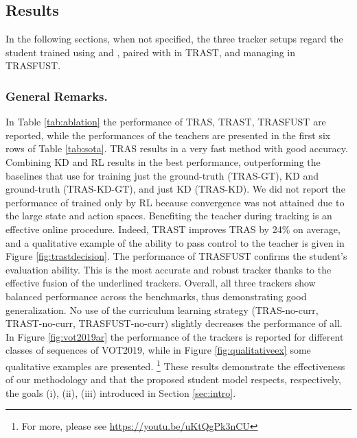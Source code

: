 \documentclass[runningheads]{llncs}
\makeatletter
\def\myalgonamefirst{TRAS\@\xspace}
\def\myalgonamesecond{TRAST\@\xspace}
\def\myalgonamethird{TRASFUST\@\xspace}
\makeatother
\begin{document}
\subsection{Results}
In the following sections, when not specified, the three tracker setups regard the student trained using  and , paired with  in \myalgonamesecond, and managing  in \myalgonamethird.

\subsubsection{General Remarks.}
In Table \ref{tab:ablation} the performance of \myalgonamefirst, \myalgonamesecond, \myalgonamethird are reported, while the performances of the teachers are presented in the first six rows of Table \ref{tab:sota}. \myalgonamefirst results in a very fast method with good accuracy. Combining KD and RL results in the best performance, outperforming the baselines that use for training just the ground-truth (\myalgonamefirst-GT), KD and ground-truth (\myalgonamefirst-KD-GT), and just KD (\myalgonamefirst-KD). We did not report the performance of  trained only by RL because convergence was not attained due to the large state and action spaces. 
Benefiting the teacher during tracking is an effective online procedure. Indeed, \myalgonamesecond improves \myalgonamefirst by 24\% on average, and a qualitative example of the ability to pass control to the teacher is given in Figure \ref{fig:trastdecision}.
The performance of \myalgonamethird confirms the student's evaluation ability. This is the most accurate and robust tracker thanks to the effective fusion of the underlined trackers. 
Overall, all three trackers show balanced performance across the benchmarks, thus demonstrating good generalization.
No use of the curriculum learning strategy (\myalgonamefirst-no-curr,  \myalgonamesecond-no-curr, \myalgonamethird-no-curr) slightly decreases the performance of all. 
In Figure \ref{fig:vot2019ar} the performance of the trackers is reported for different classes of sequences of VOT2019, while in Figure \ref{fig:qualitativeex} some qualitative examples are presented. \footnote{For more, please see \url{https://youtu.be/uKtQgPk3nCU}}
These results demonstrate the effectiveness of our methodology and that the proposed student model respects, respectively, the goals (i), (ii), (iii) introduced in Section \ref{sec:intro}.
\end{document}
